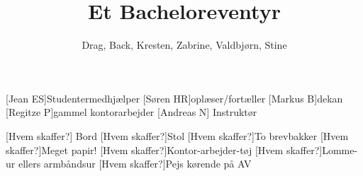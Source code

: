 \documentclass[a4paper,12pt]{article}
\title{Et Bacheloreventyr}
\author{Drag, Back, Kresten, Zabrine, Valdbjørn, Stine}
\begin{document}
\maketitle




\begin{roles}
	[Jean ES]Studentermedhjælper
	[Søren HR]oplæser/fortæller
	[Markus B]dekan
	[Regitze P]gammel kontorarbejder
	[Andreas N] Instruktør
\end{roles}


\begin{props}
	[Hvem skaffer?] Bord
	[Hvem skaffer?]Stol
	[Hvem skaffer?]To brevbakker
	[Hvem skaffer?]Meget papir!
	[Hvem skaffer?]Kontor-arbejder-tøj
	[Hvem skaffer?]Lomme-ur ellers armbåndsur
	[Hvem skaffer?]Pejs kørende på AV
\end{props}
\end{document}

